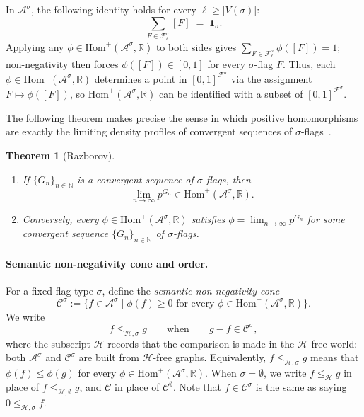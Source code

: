 \documentclass{article}
\newtheorem{theorem}{Theorem}[section]
\newcommand{\poshom}[1]{\mathrm{Hom}^+(\mathcal{A}^{#1}, \mathbb{R})}
\begin{document}
In $\mathcal{A}^\sigma$, the following identity holds for every $\ell \geq |V(\sigma)|$:
\begin{equation}
  \sum_{F \in \mathcal{F}^\sigma_\ell} [F] \;=\; \mathbf{1}_\sigma.
  \label{eq:sum-to-one}
\end{equation}
Applying any $\phi \in \poshom{\sigma}$ to both sides gives
$\sum_{F \in \mathcal{F}^\sigma_\ell} \phi([F]) = 1$;
non-negativity then forces $\phi([F]) \in [0,1]$ for every $\sigma$-flag $F$.
Thus, each $\phi \in \poshom{\sigma}$ determines a point in $[0,1]^{\mathcal{F}^\sigma}$
via the assignment $F \mapsto \phi([F])$, so $\poshom{\sigma}$ can be identified with
a subset of $[0,1]^{\mathcal{F}^\sigma}$.  %

The following theorem makes precise the sense in which positive homomorphisms
are exactly the limiting density profiles of convergent sequences of
$\sigma$-flags~\cite{razborov2007flag}.

\begin{theorem}[Razborov]\label{thm:convergent-hom}
  \begin{enumerate}
  \item[\textup{(a)}] If $\{G_n\}_{n\in\mathbb{N}}$ is a convergent sequence of
    $\sigma$-flags, then
    \[
      \lim_{n\to\infty} p^{G_n} \in \poshom{\sigma}.
    \]
  \item[\textup{(b)}] Conversely, every $\phi \in \poshom{\sigma}$ satisfies
    $\phi = \lim_{n\to\infty} p^{G_n}$ for some convergent sequence
    $\{G_n\}_{n\in\mathbb{N}}$ of $\sigma$-flags.
  \end{enumerate}
\end{theorem}

\paragraph{Semantic non-negativity cone and order.}
For a fixed flag type $\sigma$, define the \emph{semantic non-negativity cone}
\[
  \mathcal{C}^\sigma
  :=
  \{f \in \mathcal{A}^\sigma
    \mid \phi(f) \geq 0
    \text{ for every } \phi \in \poshom{\sigma}\}.
\]
We write
\[
  f \leq_{\mathcal{H},\sigma} g
  \qquad\text{when}\qquad
  g-f \in \mathcal{C}^\sigma,
\]
where the subscript $\mathcal{H}$ records that the comparison is made in the
\(\mathcal{H}\)-free world: both $\mathcal{A}^\sigma$ and $\mathcal{C}^\sigma$ are
built from \(\mathcal{H}\)-free graphs.
Equivalently, $f\leq_{\mathcal{H},\sigma} g$ means that
$\phi(f)\leq\phi(g)$ for every $\phi \in \poshom{\sigma}$.  When $\sigma=\emptyset$, we write $f \leq_{\mathcal{H}} g$ in place of $f \leq_{\mathcal{H},\emptyset} g$, and $\mathcal{C}$ in place of $\mathcal{C}^\emptyset$.
Note that $f \in \mathcal{C}^\sigma$ is the same as saying $0 \leq_{\mathcal{H},\sigma} f$.
\end{document}
